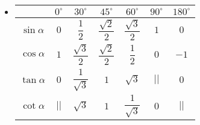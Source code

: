 \begin{itemize}
\begin{tcolorbox}[colframe=orange,colback=white,boxrule=0.2mm]
	\begin{listEX}[3]
		\item [\ding{172}] $\tan \alpha=
		\dfrac{\sin\alpha}{\cos\alpha}$
		\item [\ding{173}]  $\cot \alpha=
		\dfrac{\cos\alpha}{\sin\alpha}$
		\item [\ding{174}] $\tan \alpha=\dfrac{1}{\cot\alpha}$
	\end{listEX}
\end{tcolorbox}
	\item [\iconMT] 
	\begin{center}
		\renewcommand{\arraystretch}{2}
		\begin{tabular}{|c|c|c|c|c|c|c|}
			\hline
		 & $0^\circ$ & $30^\circ$ & $45^\circ$ & $60^\circ$ & $90^\circ$ & $180^\circ$\\
			\hline
			$\sin \alpha$  & $0$ & $\dfrac{1}{2}$ & $\dfrac{\sqrt{2}}{2}$ & $\dfrac{\sqrt{3}}{2}$ & $1$ & $0$\\
			\hline
			$\cos \alpha$  & $1$ & $\dfrac{\sqrt{3}}{2}$ & $\dfrac{\sqrt{2}}{2}$ & $\dfrac{1}{2}$ & $0$ & $-1$\\
			\hline
			$\tan \alpha$ & $0$ & $\dfrac{1}{\sqrt{3}}$ & $1$ & $\sqrt{3}$ & $\big|\big|$ & $0$\\
			\hline
			$\cot \alpha$ & $\big|\big|$ & $\sqrt{3}$ & $1$ & $\dfrac{1}{\sqrt{3}}$ & $0$ & $\big|\big|$\\
			\hline
		\end{tabular}
	\end{center}
\end{itemize}
